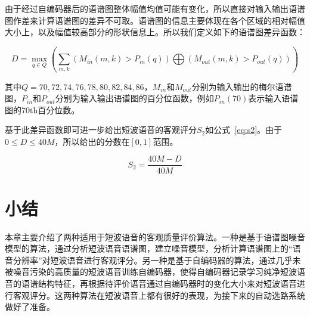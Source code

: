 由于经过自编码器后的语谱图整体幅值均值可能有变化，所以直接对输入输出语谱图作差来计算语谱图的差异不可取。语谱图的信息主要体现在各个区域的相对幅值大小上，以及幅值较高部分的形状信息上。所以我们定义如下的语谱图差异函数：

\begin{equation}
D = \max\limits_{q \in Q}\left(\sum_{m, k} (M_{in}(m,k) > P_{in}(q)) \bigoplus (M_{out}(m,k) > P_{out}(q))\right)
\end{equation}

其中$Q={70,72,74,76,78,80,82,84,86}$，$M_{in}$和$M_{out}$分别为输入输出的梅尔语谱图，$P_{in}$和$P_{out}$分别为输入输出语谱图的百分位函数，例如$P_{in}(70)$表示输入语谱图的70th百分位数。

基于此差异函数即可进一步给出短波语音的客观评分$S_2$如公式~\ref{eq:s2}。由于$0 \leq D \leq 40M$，所以给出的分数在$[0, 1]$范围。

\begin{equation}\label{eq:s2}
S_2 = \frac{40M - D}{40M}
\end{equation}

\section{小结}

本章主要介绍了两种适用于短波语音的客观质量评价算法。一种是基于语谱图噪音模型的算法，通过分析短波语音语谱图，建立噪音模型，分析计算语谱图上的“语音分辨率”对短波语音进行客观评分。另一种是基于自编码器的算法，通过几乎未被噪音污染的高质量的短波语音训练自编码器，使得自编码器记录学习纯净短波语音的语谱结构特征，再根据待评价语音通过自编码器时的变化大小来对短波语音进行客观评分。这两种算法在短波语音上都有很好的表现，为接下来的自动选路系统做好了准备。